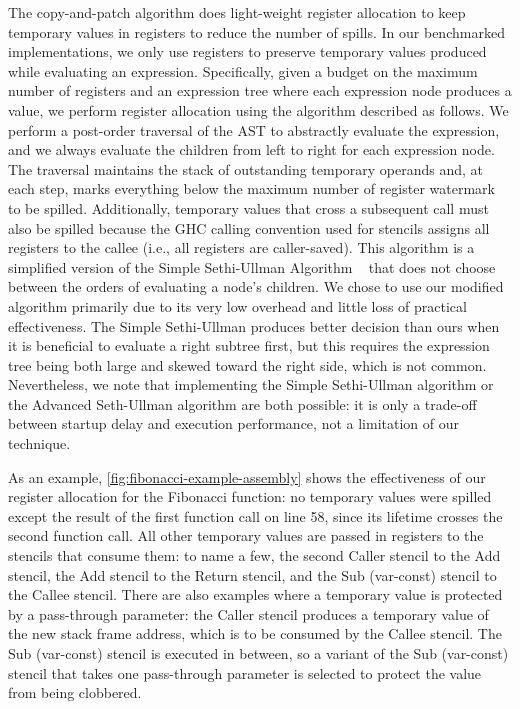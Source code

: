 \documentclass[acmsmall,nonacm,screen]{acmart}\settopmatter{printfolios=true,printccs=true,printacmref=false}
\newcommand{\figref}[1]{\autoref{#1}}
\newcommand{\cp}{copy-and-patch}
\begin{document}
The \cp{} algorithm does light-weight register allocation to keep temporary values in registers to reduce the number of spills. In our benchmarked implementations, we only use registers to preserve temporary values produced while evaluating an expression. Specifically, given a budget on the maximum number of registers and an expression tree where each expression node produces a value, we perform register allocation using the algorithm described as follows. We perform a post-order traversal of the AST to abstractly evaluate the expression, and we always evaluate the children from left to right for each expression node. The traversal maintains the stack of outstanding temporary operands and, at each step, marks everything below the maximum number of register watermark to be spilled. Additionally, temporary values that cross a subsequent call must also be spilled because the GHC calling convention used for stencils assigns all registers to the callee (i.e., all registers are caller-saved). This algorithm is a simplified version of the Simple Sethi-Ullman Algorithm ~\cite{sethiUllman,sethiUllmanWiki} that does not choose between the orders of evaluating a node's children. We chose to use our modified algorithm primarily due to its very low overhead and little loss of practical effectiveness. The Simple Sethi-Ullman produces better decision than ours when it is beneficial to evaluate a right subtree first, but this requires the expression tree being both large and skewed toward the right side, which is not common. Nevertheless, we note that implementing the Simple Sethi-Ullman algorithm or the Advanced Seth-Ullman algorithm are both possible: it is only a trade-off between startup delay and execution performance, not a limitation of our technique.

As an example, \figref{fig:fibonacci-example-assembly} shows the effectiveness of our register allocation for the Fibonacci function: no temporary values were spilled except the result of the first function call on line 58, since its lifetime crosses the second function call. All other temporary values are passed in registers to the stencils that consume them: to name a few, the second Caller stencil to the Add stencil, the Add stencil to the Return stencil, and the Sub (var-const) stencil to the Callee stencil. There are also examples where a temporary value is protected by a pass-through parameter: the Caller stencil produces a temporary value of the new stack frame address, which is to be consumed by the Callee stencil. The Sub (var-const) stencil is executed in between, so a variant of the Sub (var-const) stencil that takes one pass-through parameter is selected to protect the value from being clobbered.
\end{document}
